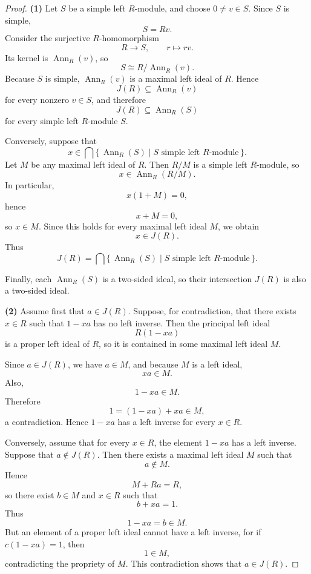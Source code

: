 \begin{proof}
    \textbf{(1)} Let $S$ be a simple left $R$-module, and choose $0\neq v\in S$. Since $S$ is simple,
    \[
        S=Rv.
    \]
    Consider the surjective $R$-homomorphism
    \[
        R\longrightarrow S,\qquad r\longmapsto rv.
    \]
    Its kernel is $\operatorname{Ann}_R(v)$, so
    \[
        S\cong R/\operatorname{Ann}_R(v).
    \]
    Because $S$ is simple, $\operatorname{Ann}_R(v)$ is a maximal left ideal of $R$. Hence
    \[
        J(R)\subseteq \operatorname{Ann}_R(v)
    \]
    for every nonzero $v\in S$, and therefore
    \[
        J(R)\subseteq \operatorname{Ann}_R(S)
    \]
    for every simple left $R$-module $S$.

    Conversely, suppose that
    \[
        x\in \bigcap \{\,\operatorname{Ann}_R(S)\mid S \text{ simple left }R\text{-module}\,\}.
    \]
    Let $M$ be any maximal left ideal of $R$. Then $R/M$ is a simple left $R$-module, so
    \[
        x\in \operatorname{Ann}_R(R/M).
    \]
    In particular,
    \[
        x(1+M)=0,
    \]
    hence
    \[
        x+M=0,
    \]
    so $x\in M$. Since this holds for every maximal left ideal $M$, we obtain
    \[
        x\in J(R).
    \]
    Thus
    \[
        J(R)=\bigcap \{\,\operatorname{Ann}_R(S)\mid S \text{ simple left }R\text{-module}\,\}.
    \]

    Finally, each $\operatorname{Ann}_R(S)$ is a two-sided ideal, so their intersection $J(R)$ is also a two-sided ideal.

    \medskip

    \textbf{(2)} Assume first that $a\in J(R)$. Suppose, for contradiction, that there exists $x\in R$ such that $1-xa$ has no left inverse. Then the principal left ideal
    \[
        R(1-xa)
    \]
    is a proper left ideal of $R$, so it is contained in some maximal left ideal $M$.

    Since $a\in J(R)$, we have $a\in M$, and because $M$ is a left ideal,
    \[
        xa\in M.
    \]
    Also,
    \[
        1-xa\in M.
    \]
    Therefore
    \[
        1=(1-xa)+xa\in M,
    \]
    a contradiction. Hence $1-xa$ has a left inverse for every $x\in R$.

    Conversely, assume that for every $x\in R$, the element $1-xa$ has a left inverse. Suppose that $a\notin J(R)$. Then there exists a maximal left ideal $M$ such that
    \[
        a\notin M.
    \]
    Hence
    \[
        M+Ra=R,
    \]
    so there exist $b\in M$ and $x\in R$ such that
    \[
        b+xa=1.
    \]
    Thus
    \[
        1-xa=b\in M.
    \]
    But an element of a proper left ideal cannot have a left inverse, for if $c(1-xa)=1$, then
    \[
        1\in M,
    \]
    contradicting the propriety of $M$. This contradiction shows that $a\in J(R)$.


\end{proof}
